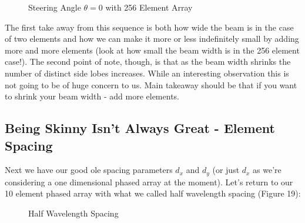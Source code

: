 \documentclass[10pt,a4paper]{article}
\begin{document}
\begin{figure}[!htb]
\caption{\label{fig:my-label} Steering Angle $\theta=0$ with 256 Element Array}
\end{figure}

The first take away from this sequence is both how wide the beam is in the case of two elements and how we can make it more or less indefinitely small by adding more and more elements (look at how small the beam width is in the 256 element case!). The second point of note, though, is that as the beam width shrinks the number of distinct side lobes increases. While an interesting observation this is not going to be of huge concern to us. Main takeaway should be that if you want to shrink your beam width - add more elements. 

\subsection{Being Skinny Isn't Always Great - Element Spacing}
Next we have our good ole spacing parameters $d_x$ and $d_y$ (or just $d_x$ as we're considering a one dimensional phased array at the moment). Let's return to our 10 element phased array with what we called half wavelength spacing (Figure 19):

\begin{figure}[!htb]
\caption{\label{fig:my-label} Half Wavelength Spacing}
\end{figure}
\end{document}
